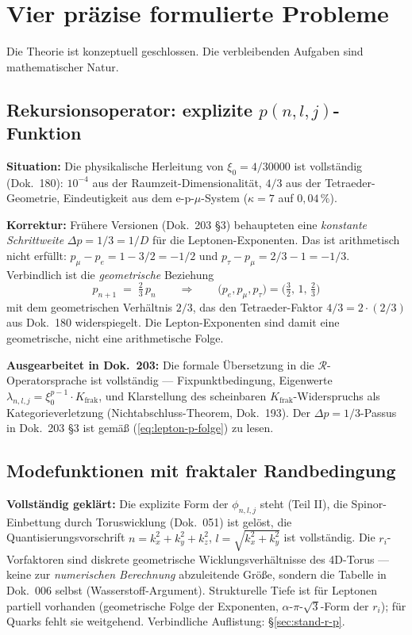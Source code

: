 \section{Vier präzise formulierte Probleme}

Die Theorie ist konzeptuell geschlossen. Die verbleibenden Aufgaben
sind mathematischer Natur.

\subsection{Rekursionsoperator: explizite \texorpdfstring{$p(n,l,j)$}{p(n,l,j)}-Funktion}

\textbf{Situation:} Die physikalische Herleitung von $\xi_0 = 4/30000$
ist vollständig (Dok.~180): $10^{-4}$ aus der Raumzeit-Dimensionalität,
$4/3$ aus der Tetraeder-Geometrie, Eindeutigkeit aus dem e-p-$\mu$-System
($\kappa=7$ auf $0{,}04\,\%$).

\textbf{Korrektur:} Frühere Versionen (Dok.~203 §3) behaupteten eine
\emph{konstante Schrittweite} $\Delta p = 1/3 = 1/D$ für die
Leptonen-Exponenten. Das ist arithmetisch nicht erfüllt:
$p_\mu - p_e = 1 - 3/2 = -1/2$ und $p_\tau - p_\mu = 2/3 - 1 = -1/3$.
Verbindlich ist die \emph{geometrische} Beziehung
\begin{equation}
  p_{n+1} \;=\; \tfrac{2}{3}\, p_n
  \qquad
  \Rightarrow \qquad
  \bigl(p_e, p_\mu, p_\tau\bigr) = \bigl(\tfrac{3}{2},\,1,\,\tfrac{2}{3}\bigr)
  \label{eq:lepton-p-folge}
\end{equation}
mit dem geometrischen Verhältnis $2/3$, das den Tetraeder-Faktor
$4/3 = 2 \cdot (2/3)$ aus Dok.~180 widerspiegelt. Die Lepton-Exponenten
sind damit eine geometrische, nicht eine arithmetische Folge.

\textbf{Ausgearbeitet in Dok.~203:} Die formale Übersetzung in die
$\mathcal{R}$-Operatorsprache ist vollständig — Fixpunktbedingung,
Eigenwerte $\lambda_{n,l,j} = \xi_0^{p-1}\cdot K_{\text{frak}}$,
und Klarstellung des scheinbaren $K_{\text{frak}}$-Widerspruchs
als Kategorieverletzung (Nichtabschluss-Theorem, Dok.~193). Der
$\Delta p = 1/3$-Passus in Dok.~203 §3 ist gemäß
(\ref{eq:lepton-p-folge}) zu lesen.

\subsection{Modefunktionen mit fraktaler Randbedingung}

\textbf{Vollständig geklärt:} Die explizite Form der $\phi_{n,l,j}$ steht
(Teil II), die Spinor-Einbettung durch Toruswicklung (Dok.~051) ist gelöst,
die Quantisierungsvorschrift $n = k_x^2+k_y^2+k_z^2$,
$l = \sqrt{k_x^2+k_y^2}$ ist vollständig. Die $r_i$-Vorfaktoren
sind diskrete geometrische Wicklungsverhältnisse des 4D-Torus ---
keine zur \emph{numerischen Berechnung} abzuleitende Größe, sondern
die Tabelle in Dok.~006 selbst (Wasserstoff-Argument). Strukturelle
Tiefe ist für Leptonen partiell vorhanden (geometrische Folge der
Exponenten, $\alpha$-$\pi$-$\sqrt{3}$-Form der $r_i$); für Quarks
fehlt sie weitgehend. Verbindliche Auflistung: §\ref{sec:stand-r-p}.

